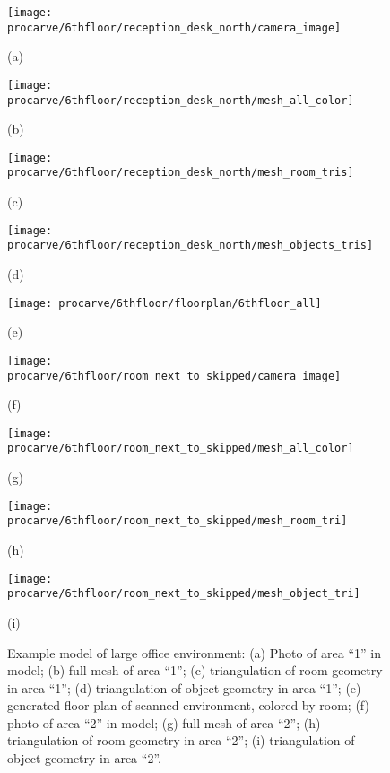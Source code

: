 \documentclass[12pt,onecolumn,oneside]{book}
\begin{document}
\begin{figure}[p]

	\begin{minipage}[t]{0.24\linewidth}
		\centerline{\texttt{[image: procarve/6thfloor/reception\_desk\_north/camera\_image]}}
		\centerline{(a)}
	\end{minipage}
	\hfill
	\begin{minipage}[t]{0.24\linewidth}
		\centerline{\texttt{[image: procarve/6thfloor/reception\_desk\_north/mesh\_all\_color]}}
		\centerline{(b)}
	\end{minipage}
	\hfill
	\begin{minipage}[t]{0.24\linewidth}
		\centerline{\texttt{[image: procarve/6thfloor/reception\_desk\_north/mesh\_room\_tris]}}
		\centerline{(c)}
	\end{minipage}
	\hfill
	\begin{minipage}[t]{0.24\linewidth}
		\centerline{\texttt{[image: procarve/6thfloor/reception\_desk\_north/mesh\_objects\_tris]}}
		\centerline{(d)}
	\end{minipage}

	\begin{minipage}[t]{1.0\linewidth}
		\centerline{\texttt{[image: procarve/6thfloor/floorplan/6thfloor\_all]}}
		\centerline{(e)}
	\end{minipage}

	\begin{minipage}[t]{0.24\linewidth}
		\centerline{\texttt{[image: procarve/6thfloor/room\_next\_to\_skipped/camera\_image]}}
		\centerline{(f)}
	\end{minipage}
	\hfill
	\begin{minipage}[t]{0.24\linewidth}
		\centerline{\texttt{[image: procarve/6thfloor/room\_next\_to\_skipped/mesh\_all\_color]}}
		\centerline{(g)}
	\end{minipage}
	\hfill
	\begin{minipage}[t]{0.24\linewidth}
		\centerline{\texttt{[image: procarve/6thfloor/room\_next\_to\_skipped/mesh\_room\_tri]}}
		\centerline{(h)}
	\end{minipage}
	\hfill
	\begin{minipage}[t]{0.24\linewidth}
		\centerline{\texttt{[image: procarve/6thfloor/room\_next\_to\_skipped/mesh\_object\_tri]}}
		\centerline{(i)}
	\end{minipage}	

	\caption[Example model of large office environment.]{Example model of large office environment:  (a) Photo of area ``1'' in model; (b) full mesh of area ``1''; (c) triangulation of room geometry in area ``1''; (d) triangulation of object geometry in area ``1''; (e) generated floor plan of scanned environment, colored by room; (f) photo of area ``2'' in model; (g) full mesh of area ``2''; (h) triangulation of room geometry in area ``2''; (i) triangulation of object geometry in area ``2''.}
	\label{fig:procarve_6thfloor}

\end{figure}
\end{document}
